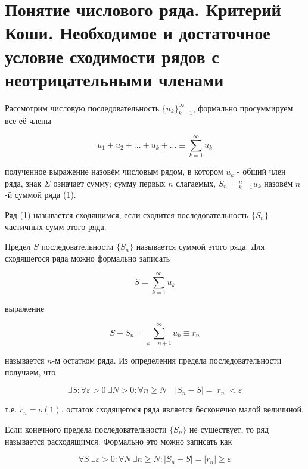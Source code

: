 \section{Понятие числового ряда. Критерий Коши. Необходимое и достаточное условие сходимости рядов с неотрицательными членами}

Рассмотрим числовую последовательность $\{u_k\}_{k=1}^\infty$, формально просуммируем все её члены

\begin{equation}
	u_1 + u_2 + ... + u_k + ... \equiv \displaystyle\sum_{k = 1}^\infty u_k
\end{equation}

полученное выражение назовём числовым рядом, в котором $u_k$ - общий член ряда, знак $\Sigma$ означает сумму; сумму первых $n$ слагаемых, $S_n = \displaystyle_{k = 1}^n u_k$ назовём $n$-й суммой ряда (1).

\begin{definition}
	Ряд (1) называется сходящимся, если сходится последовательность $\{S_n\}$ частичных сумм этого ряда.
\end{definition}

Предел $S$ последовательности $\{S_n\}$ называется суммой этого ряда. Для сходящегося ряда можно формально записать

\begin{equation*}
	S = \displaystyle\sum_{k  = 1}^\infty u_k
\end{equation*}

выражение

\begin{equation*}
	S - S_n = \displaystyle\sum_{k = n + 1}^\infty u_k \equiv r_n
\end{equation*}

называется $n$-м остатком ряда. Из определения предела последовательности получаем, что

\begin{equation*}
	\exists S: \forall\varepsilon > 0\: \exists N > 0: \forall n \geqslant N\quad |S_n - S| = |r_n| < \varepsilon
\end{equation*}

т.е. $r_n = o(1)$, остаток сходящегося ряда является бесконечно малой величиной.

Если конечного предела последовательности $\{S_n\}$ не существует, то ряд называется расходящимся. Формально это можно записать как

\begin{equation*}
	\forall S \: \exists\varepsilon > 0: \forall N \: \exists n \geqslant N: |S_n - S| = |r_n| \geqslant \varepsilon
\end{equation*}

